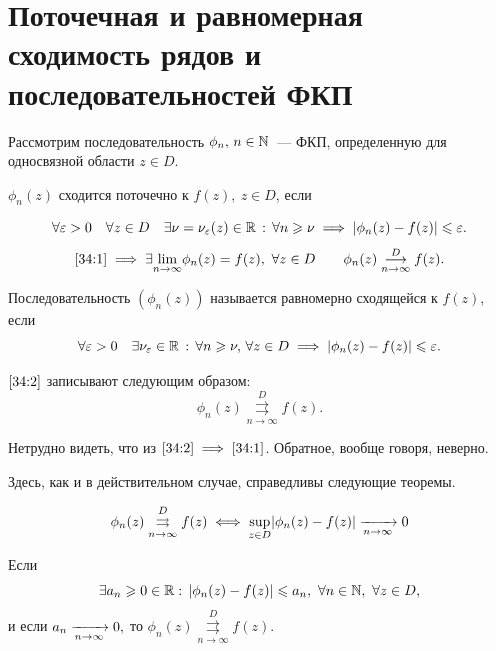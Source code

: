 \documentclass[../../main.tex]{subfiles}
\begin{document}
\section{Поточечная и равномерная сходимость рядов и последовательностей ФКП}

Рассмотрим последовательность $ \phi_n,\, n \in \mathbb{N} $~--- ФКП, определенную для 
односвязной области $ z \in D $.

$ \phi_n(z) $ сходится поточечно к $ f(z),\ z \in D $, если

\begin{equation}\label{34:1}
	\forall \varepsilon > 0 \quad \forall z \in D \quad \exists\nu = \nu_\varepsilon (z) 
	\in \mathbb{R}\, :\,
	\forall n \geqslant \nu \implies |\phi_n(z) - f(z)| \leqslant \varepsilon.
\end{equation}
\[ \eqref{34:1} \implies \exists \underset{n \to \infty}{\lim} \phi_n (z) 
= f(z),\ 
\forall z \in D \qquad \phi_n(z) \overset{D}{\underset{n \to 
\infty}\longrightarrow} f(z). \]

Последовательность $ (\phi_n(z)) $ называется равномерно сходящейся к $ f(z) 
$, если
\begin{equation}\label{34:2}
	\forall \varepsilon > 0 \quad \exists\nu_\varepsilon \in \mathbb{R}\, :\,
	\forall n \geqslant \nu,\, \forall z \in D \implies |\phi_n(z) - f(z)| \leqslant \varepsilon.
\end{equation}

$ \eqref{34:2} $ записывают следующим образом:
\[ \phi_n(z) \overset{D}{\underset{n \to \infty}\rightrightarrows} f(z). \]

Нетрудно видеть, что из $ \eqref{34:2} \implies \eqref{34:1} $. Обратное, 
вообще говоря, неверно.

Здесь, как и в действительном случае, справедливы следующие теоремы.

\begin{thm}
	\[ \phi_n(z) \overset{D}{\underset{n \to \infty}\rightrightarrows} f(z) \iff 
	\underset{z \in D}{\sup}|\phi_n(z) - f(z)| \xrightarrow[n \rightarrow \infty]{} 0 \]
\end{thm}

\begin{thm}
	Если 
	\[ \exists a_n \geqslant 0 \in \mathbb{R} :\, |\phi_n(z) - f(z)| \leqslant a_n,\ \forall n 
	\in \mathbb{N},\ \forall z \in D, \]
	и если $ a_n \xrightarrow[n \rightarrow \infty]{} 0, $
	то $ \phi_n(z) \overset{D}{\underset{n \to \infty}\rightrightarrows} f(z) $.
\end{thm}
\end{document}
